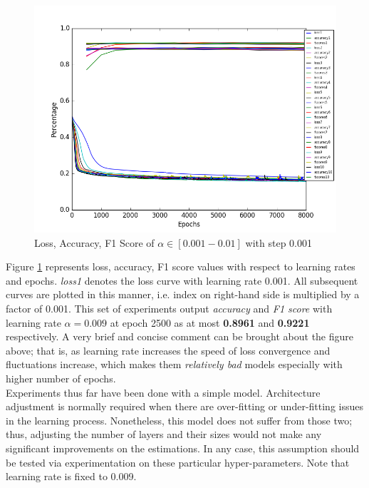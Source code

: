 \documentclass[conference]{IEEEtran}
\begin{document}
\begin{figure}[H]
	\includegraphics[width=1\columnwidth]{mix_plot_lr.png}
	\caption{Loss, Accuracy, F1 Score of $\alpha \in [0.001 - 0.01]$ with step 0.001} 
	\label{mix_lr}
\end{figure}
Figure \ref{mix_lr} represents loss,  accuracy, F1 score values with respect to learning rates and epochs. \textit{loss1} denotes the loss curve with learning rate 0.001. All subsequent curves are plotted in this manner, i.e. index on right-hand side is multiplied by a factor of 0.001. This set of experiments output \textit{accuracy} and \textit{F1 score} with learning rate $\alpha=0.009$ at epoch 2500 as at most \textbf{0.8961} and \textbf{0.9221} respectively. A very brief and concise comment can be brought about the figure above; that is, as learning rate increases the speed of loss convergence and fluctuations increase, which makes them \textit{relatively bad} models especially with higher number of epochs.\\

Experiments thus far have been done with a simple model. Architecture adjustment is normally required when there are over-fitting or under-fitting issues in the learning process. Nonetheless, this model does not suffer from those two; thus, adjusting the number of layers and their sizes would not make any significant improvements on the estimations. In any case, this assumption should be tested via experimentation on these particular hyper-parameters. Note that learning rate is fixed to 0.009.\\
\end{document}
